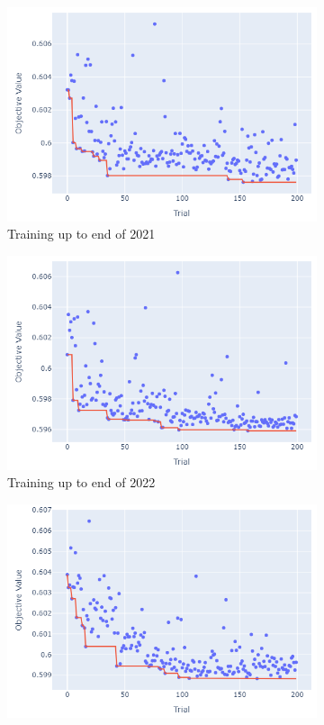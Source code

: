 \documentclass[12pt,twoside]{report}
\begin{document}
\begin{figure}[htb]
\begin{subfigure}{.33\linewidth}
  \includegraphics[width=0.95\linewidth]{figures/va_lightgbm_cutoff_2021.png}
  \caption{Training up to end of 2021}
\end{subfigure}
\par\bigskip
\par\bigskip
\begin{subfigure}{.33\linewidth}
  \centering
  \includegraphics[width=0.95\linewidth]{figures/va_lightgbm_cutoff_2022.png}
  \caption{Training up to end of 2022}
\end{subfigure}%
\begin{subfigure}{.33\linewidth}
  \centering
  \includegraphics[width=0.95\linewidth]{figures/va_lightgbm_cutoff_2023.png}

\end{subfigure}
\end{figure}
\end{document}
